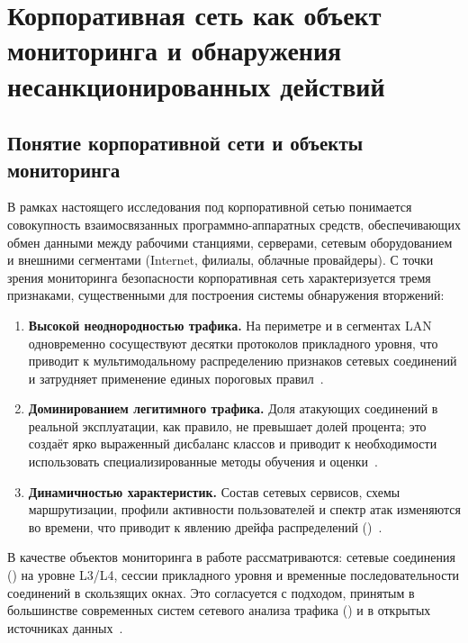 
\section{Корпоративная сеть как объект мониторинга и обнаружения несанкционированных действий}

\subsection{Понятие корпоративной сети и объекты мониторинга}

В рамках настоящего исследования под корпоративной сетью понимается совокупность
взаимосвязанных программно-аппаратных средств, обеспечивающих обмен данными между
рабочими станциями, серверами, сетевым оборудованием и внешними сегментами (Internet,
филиалы, облачные провайдеры). С точки зрения мониторинга безопасности
корпоративная сеть характеризуется тремя признаками, существенными для построения
системы обнаружения вторжений:

\begin{enumerate}
    \item \textbf{Высокой неоднородностью трафика.} На периметре и в сегментах LAN
    одновременно сосуществуют десятки протоколов прикладного уровня, что приводит к
    мультимодальному распределению признаков сетевых соединений и затрудняет
    применение единых пороговых правил~\cite{khraisat2019survey, ahmad2021nids}.
    \item \textbf{Доминированием легитимного трафика.} Доля атакующих соединений в
    реальной эксплуатации, как правило, не превышает долей процента; это создаёт
    ярко выраженный дисбаланс классов и приводит к необходимости использовать
    специализированные методы обучения и оценки~\cite{sommer2010outside,
    chawla2002smote, lin2017focal}.
    \item \textbf{Динамичностью характеристик.} Состав сетевых сервисов, схемы
    маршрутизации, профили активности пользователей и спектр атак изменяются во
    времени, что приводит к явлению дрейфа распределений ()~\cite{gama2014drift, andresini2021insomnia}.
\end{enumerate}

В качестве объектов мониторинга в работе рассматриваются: сетевые соединения
() на уровне L3/L4, сессии прикладного уровня и временные
последовательности соединений в скользящих окнах. Это согласуется с подходом,
принятым в большинстве современных систем сетевого анализа трафика
() и в открытых источниках
данных~\cite{moustafa2015unsw, sharafaldin2018toward}.

